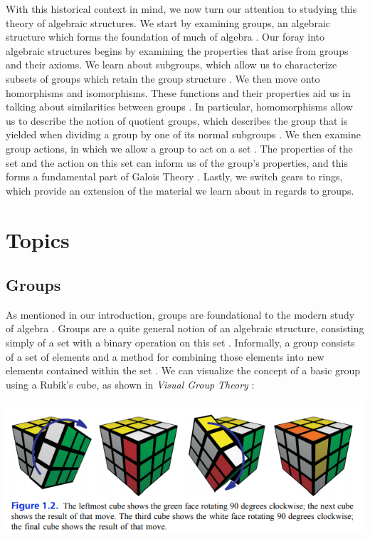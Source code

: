 \documentclass[11pt, reqno]{amsart}
\theoremstyle{plain}
\theoremstyle{definition}
\theoremstyle{example}
\begin{document}
\par
With this historical context in mind, we now turn our attention to studying this theory of algebraic structures. We start by examining groups, an algebraic structure which forms the foundation of much of algebra \cite{dummit, pinter}. Our foray into algebraic structures begins by examining the properties that arise from groups and their axioms. We learn about subgroups, which allow us to characterize subsets of groups which retain the group structure \cite{dummit, pinter, carter}. We then move onto homorphisms and isomorphisms. These functions and their properties aid us in talking about similarities between groups \cite{dummit}. In particular, homomorphisms allow us to describe the notion of quotient groups, which describes the group that is yielded when dividing a group by one of its normal subgroups \cite{dummit, carter}. We then examine group actions, in which we allow a group to act on a set \cite{dummit}. The properties of the set and the action on this set can inform us of the group's properties, and this forms a fundamental part of Galois Theory \cite{dummit}. Lastly, we switch gears to rings, which provide an extension of the material we learn about in regards to groups.

\newpage

\section{Topics}

\subsection{Groups}

\par
As mentioned in our introduction, groups are foundational to the modern study of algebra \cite{dummit, abstractwiki}. Groups are a quite general notion of an algebraic structure, consisting simply of a set with a binary operation on this set \cite{groupwiki}. Informally, a group consists of a set of elements and a method for combining those elements into new elements contained within the set \cite{pinter, carter}. We can visualize the concept of a basic group using a Rubik's cube, as shown in \textit{Visual Group Theory} \cite[\S 1.1, p. 4]{carter}:

\includegraphics[scale=1]{rubiks}
\end{document}
